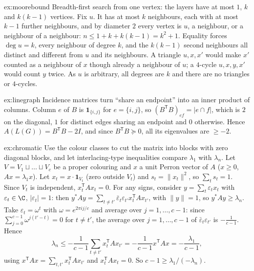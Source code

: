 \begin{solution}{ex:moorebound}
\idea Breadth-first search from one vertex: the layers have at most $1$, $k$ and $k(k-1)$ vertices.
\writeup Fix $u$. It has at most $k$ neighbours, each with at most $k-1$ further neighbours, and by diameter $2$ every vertex is $u$, a
neighbour, or a neighbour of a neighbour: $n\le1+k+k(k-1)=k^2+1$. Equality forces $\deg u=k$, every neighbour of degree $k$, and the
$k(k-1)$ second neighbours all distinct and different from $u$ and its neighbours. A triangle $u,x,x'$ would make $x'$ counted as a
neighbour of $x$ though already a neighbour of $u$; a $4$-cycle $u,x,y,x'$ would count $y$ twice. As $u$ is arbitrary, all degrees are
$k$ and there are no triangles or $4$-cycles.
\end{solution}

\begin{solution}{ex:linegraph}
\idea Incidence matrices turn ``share an endpoint'' into an inner product of columns.
\writeup Column $e$ of $B$ is $\mathbf 1_{\{i,j\}}$ for $e=\{i,j\}$, so $(B^{\mathsf T}B)_{ef}=|e\cap f|$, which is $2$ on the diagonal, $1$
for distinct edges sharing an endpoint and $0$ otherwise. Hence $A(L(G))=B^{\mathsf T}B-2I$, and since $B^{\mathsf T}B\succeq0$, all its
eigenvalues are $\ge-2$.
\end{solution}

\begin{solution}{ex:chromatic}
\idea Use the colour classes to cut the matrix into blocks with zero diagonal blocks, and let interlacing-type inequalities compare
$\lambda_1$ with $\lambda_n$.
\writeup Let $V=V_1\sqcup\dots\sqcup V_c$ be a proper colouring and $x$ a unit Perron vector of $A$ ($x\ge0$, $Ax=\lambda_1x$). Let
$x_t=x\cdot\mathbf 1_{V_t}$ (zero outside $V_t$) and $s_t=\|x_t\|^2$, so $\sum_ts_t=1$. Since $V_t$ is independent, $x_t^{\mathsf T}Ax_t=0$.
For any signs, consider $y=\sum_t\varepsilon_tx_t$ with $\varepsilon_t\in\C$, $|\varepsilon_t|=1$: then $y^*Ay=\sum_{t\ne t'}\bar\varepsilon_t
\varepsilon_{t'}x_t^{\mathsf T}Ax_{t'}$, with $\|y\|=1$, so $y^*Ay\ge\lambda_n$. Take $\varepsilon_t=\omega^{t}$ with $\omega=e^{2\pi ij/c}$ and
average over $j=1,\dots,c-1$: since $\sum_{j=0}^{c-1}\omega^{j(t'-t)}=0$ for $t\ne t'$, the average over $j=1,\dots,c-1$ of
$\bar\varepsilon_t\varepsilon_{t'}$ is $-\frac1{c-1}$. Hence
\[
\lambda_n\le-\frac1{c-1}\sum_{t\ne t'}x_t^{\mathsf T}Ax_{t'}=-\frac1{c-1}x^{\mathsf T}Ax=-\frac{\lambda_1}{c-1},
\]
using $x^{\mathsf T}Ax=\sum_{t,t'}x_t^{\mathsf T}Ax_{t'}$ and $x_t^{\mathsf T}Ax_t=0$. So $c-1\ge\lambda_1/(-\lambda_n)$.
\end{solution}

